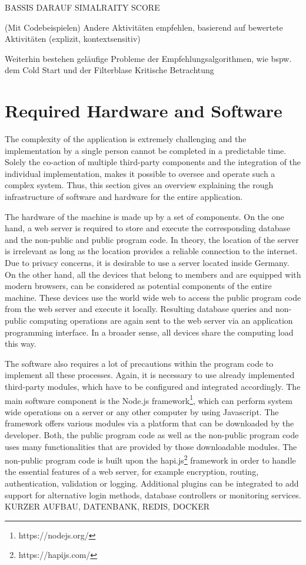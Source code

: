 \documentclass[12pt,numbers=noenddot,parskip,bibliography=totocnumbered,listof=totocnumbered]{scrreprt}
\begin{document}
BASSIS DARAUF SIMALRAITY SCORE 

 (Mit Codebeispielen) Andere Aktivitäten empfehlen, basierend auf bewertete Aktivitäten (explizit, kontextsensitiv)

Weiterhin bestehen geläufige Probleme der Empfehlungsalgorithmen, wie bspw. dem Cold Start und der Filterblase
Kritische Betrachtung

\section{Required Hardware and Software}
The complexity of the application is extremely challenging and the implementation by a single person cannot be completed in a predictable time. Solely the co-action of multiple third-party components and the integration of the individual implementation, makes it possible to oversee and operate such a complex system. Thus, this section gives an overview explaining the rough infrastructure of software and hardware for the entire application.

The hardware of the machine is made up by a set of components. On the one hand, a web server is required to store and execute the corresponding database and the non-public and public program code. In theory, the location of the server is irrelevant as long as the location provides a reliable connection to the internet. Due to privacy concerns, it is desirable to use a server located inside Germany.
On the other hand, all the devices that belong to members and are equipped with modern browsers, can be considered as potential components of the entire machine. These devices use the world wide web to access the public program code from the web server and execute it locally. Resulting database queries and non-public computing operations are again sent to the web server via an application programming interface. In a broader sense, all devices share the computing load this way.

The software also requires a lot of precautions within the program code to implement all these processes. Again, it is necessary to use already implemented third-party modules, which have to be configured and integrated accordingly. The main software component is the Node.js framework\footnote{https://nodejs.org/}, which can perform system wide operations on a server or any other computer by using Javascript. The framework offers various modules via a platform that can be downloaded by the developer. Both, the public program code as well as the non-public program code uses many functionalities that are provided by those downloadable modules. The non-public program code is built upon the hapi.js\footnote{https://hapijs.com/} framework in order to handle the essential features of a web server, for example encryption, routing, authentication, validation or logging. Additional plugins can be integrated to add support for alternative login methods, database controllers or monitoring services. 
KURZER AUFBAU, DATENBANK, REDIS, DOCKER
\end{document}

